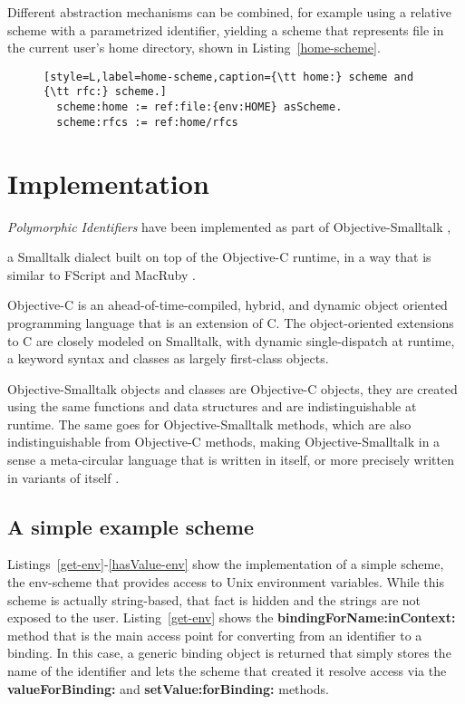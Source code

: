 \documentclass[preprint,authoryear]{acm_proc_article-sp}
\newcommand\mpw[1]{\mynote{Marcel}{#1}}
\begin{document}
Different abstraction mechanisms can be combined, for example using a
relative scheme with a parametrized identifier, yielding
a scheme that represents file in the current user's home directory, shown
in Listing~\ref{home-scheme}.


\begin{figure}[htbp]
\begin{lstlisting}[style=L,label=home-scheme,caption={\tt home:} scheme and {\tt rfc:} scheme.]
  scheme:home := ref:file:{env:HOME} asScheme.
  scheme:rfcs := ref:home/rfcs
\end{lstlisting}
\end{figure}



\mpw{here}

\section{Implementation}
\label{implementation}
\emph{Polymorphic Identifiers} have been implemented as part of Objective-Smalltalk \cite{objst},

a Smalltalk dialect built on top of the Objective-C\cite{objc-evol}\cite{objc-apple} runtime, 
in a way that is similar to FScript\cite{fscript} and MacRuby \cite{macruby}.

Objective-C is an ahead-of-time-compiled, hybrid, and dynamic object oriented programming language
that is an extension of C.  The object-oriented extensions to C are closely modeled on
Smalltalk, with dynamic single-dispatch at runtime, a keyword syntax and classes as
largely first-class objects.

Objective-Smalltalk objects and classes are Objective-C objects, they are created using
the same functions and data structures and are indistinguishable at runtime.
The same goes for Objective-Smalltalk methods, which are also indistinguishable from
Objective-C methods, making Objective-Smalltalk in a sense a meta-circular language
that is written in itself, or more precisely written in variants of itself \cite{kleinvm}\cite{squeak}.



\subsection{A simple example scheme}

Listings~\ref{get-env}-\ref{hasValue-env} show the implementation of a simple scheme,
the env-scheme that provides access to Unix environment variables.  While this scheme
is actually string-based, that fact is hidden and the strings are not exposed to the user.
Listing~\ref{get-env}
shows the {\bf bindingForName:inContext:} method that is the main access point for
converting from an identifier to a binding.  In this case, a generic binding object is returned
that simply stores the name of the identifier and lets the scheme that created it resolve
access via the {\bf valueForBinding:} and {\bf setValue:forBinding:} methods.
\end{document}
